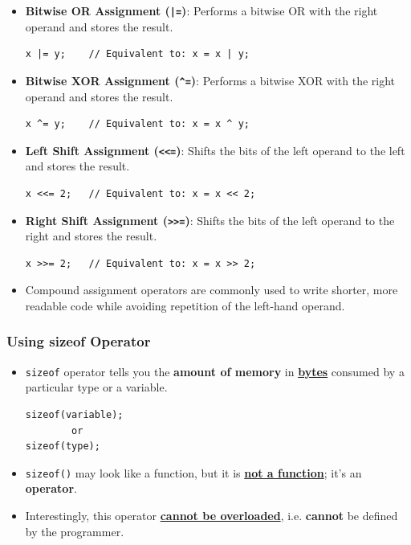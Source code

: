 \documentclass[10pt]{article}
\begin{document}
\begin{itemize}
	\item \textbf{Bitwise OR Assignment (\texttt{|=})}: Performs a bitwise OR with the right operand and stores the result.
	\begin{verbatim}
x |= y;    // Equivalent to: x = x | y;
	\end{verbatim}

	\item \textbf{Bitwise XOR Assignment (\texttt{\string^=})}: Performs a bitwise XOR with the right operand and stores the result.
	\begin{verbatim}
x ^= y;    // Equivalent to: x = x ^ y;
	\end{verbatim}

	\item \textbf{Left Shift Assignment (\texttt{<<=})}: Shifts the bits of the left operand to the left and stores the result.
	\begin{verbatim}
x <<= 2;   // Equivalent to: x = x << 2;
	\end{verbatim}

	\item \textbf{Right Shift Assignment (\texttt{>>=})}: Shifts the bits of the left operand to the right and stores the result.
	\begin{verbatim}
x >>= 2;   // Equivalent to: x = x >> 2;
	\end{verbatim}

	\item Compound assignment operators are commonly used to write shorter, more readable code while avoiding repetition of the left-hand operand.
\end{itemize}

\newpage

\subsubsection{Using sizeof Operator}
\begin{itemize}
	\item \verb|sizeof| operator tells you the \textbf{amount of memory} in \textbf{\underline{bytes}} consumed by a particular type or a variable.

		\begin{verbatim}
sizeof(variable);
		or
sizeof(type);
		\end{verbatim}

	\item \verb|sizeof()| may look like a function, but it is \textbf{\underline{not a function}}; it's an \textbf{operator}.
	\item Interestingly, this operator \underline{\textbf{cannot be overloaded}}, i.e. \textbf{cannot} be defined by the programmer.
\end{itemize}
\end{document}
